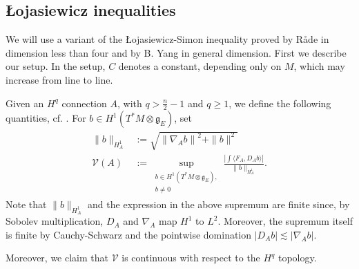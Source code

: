 \documentclass[12pt]{amsart}
\renewcommand{\1}{{\mathbf 1}}
\theoremstyle{others}
\numberwithin{equation}{section}
\begin{document}
\vspace{5mm}




\subsection{\L ojasiewicz inequalities} \label{lojasiewiczineq} We will use a variant of the \L ojasiewicz-Simon inequality proved by R\aa de in dimension less than four and by B. Yang \cite[Lemma 12]{byanguniqueness} in general dimension. First we describe our setup. In the setup, \(C\) denotes a constant, depending only on \(M\), which may increase from line to line. \par
Given an \(H^q\) connection \(A\), with \(q > \frac{n}{2}-1\) and \(q \geq 1\), we define the following quantities, cf. \cite[(2.10) in Def. 2.3]{taubespathconnected}. For \(b \in H^1\left(T^\ast M \otimes \mathfrak{g}_E\right)\), set
\begin{align*}
    \|b\|_{H_A^1} &:= \sqrt{\left\|\nabla_A b\right\|^2 + \|b\|^2} \\
    \mathcal{V}(A) &:= \sup_{\substack{b \in H^1\left(T^\ast M \otimes \mathfrak{g}_E\right), \\ b \neq 0}} \frac{\left|\int \langle F_A, D_A b\rangle\right|}{\|b\|_{H_A^1}}.
\end{align*} Note that \(\|b\|_{H_A^1}\) and the expression in the above supremum are finite since, by Sobolev multiplication, \(D_A\) and \(\nabla_A\) map \(H^1\) to \(L^2\). Moreover, the supremum itself is finite by Cauchy-Schwarz and the pointwise domination \(|D_A b| \lesssim |\nabla_A b|\). \par
Moreover, we claim that \(\mathcal{V}\) is continuous with respect to the \(H^q\) topology.
\end{document}
